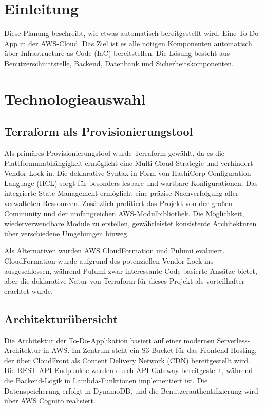 \newpage

\section{Einleitung}
Diese Planung beschreibt, wie etwas automatisch bereitgestellt wird.
Eine To-Do-App in der AWS-Cloud. Das Ziel ist es alle nötigen Komponenten automatisch 
über Infrastructure-as-Code (IaC) bereitstellen. Die Lösung besteht aus Benutzerschnittstelle, 
Backend, Datenbank und Sicherheitskomponenten.

\section{Technologieauswahl}
\subsection{Terraform als Provisionierungstool}
Als primäres Provisionierungstool wurde Terraform gewählt, da es die Plattformunabhängigkeit
ermöglicht eine Multi-Cloud Strategie und verhindert Vendor-Lock-in. 
Die deklarative Syntax in Form von HashiCorp Configuration Language (HCL) sorgt für besonders lesbare 
und wartbare Konfigurationen. Das integrierte State-Management ermöglicht eine präzise Nachverfolgung 
aller verwalteten Ressourcen. Zusätzlich profitiert das Projekt von der großen Community und der 
umfangreichen AWS-Modulbibliothek. Die Möglichkeit, wiederverwendbare Module zu erstellen, gewährleistet 
konsistente Architekturen über verschiedene Umgebungen hinweg.

Als Alternativen wurden AWS CloudFormation und Pulumi evaluiert. CloudFormation wurde aufgrund des 
potenziellen Vendor-Lock-ins ausgeschlossen, während Pulumi zwar interessante Code-basierte Ansätze 
bietet, aber die deklarative Natur von Terraform für dieses Projekt als vorteilhafter erachtet wurde.

\subsection{Architekturübersicht}
Die Architektur der To-Do-Applikation basiert auf einer modernen Serverless-Architektur in AWS. 
Im Zentrum steht ein S3-Bucket für das Frontend-Hosting, der über CloudFront als Content Delivery 
Network (CDN) bereitgestellt wird. Die REST-API-Endpunkte werden durch API Gateway bereitgestellt, 
während die Backend-Logik in Lambda-Funktionen implementiert ist. Die Datenspeicherung erfolgt in 
DynamoDB, und die Benutzerauthentifizierung wird über AWS Cognito realisiert.

